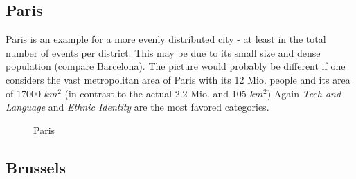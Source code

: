 \subsection*{Paris}

Paris is an example for a more evenly distributed city - at least in the total number of events per district. This may be due to its small size and dense population (compare Barcelona). The picture would probably be different if one considers the vast metropolitan area of Paris with its 12 Mio. people and its area of 17000 $ km^2 $ (in contrast to the actual 2.2 Mio. and 105 $ km^2 $)
Again \emph{Tech and Language} and \emph{Ethnic Identity} are the most favored categories. 

\begin{figure}[!htp]
	\hfill
	\caption{Paris}
\end{figure}


\subsection*{Brussels}

